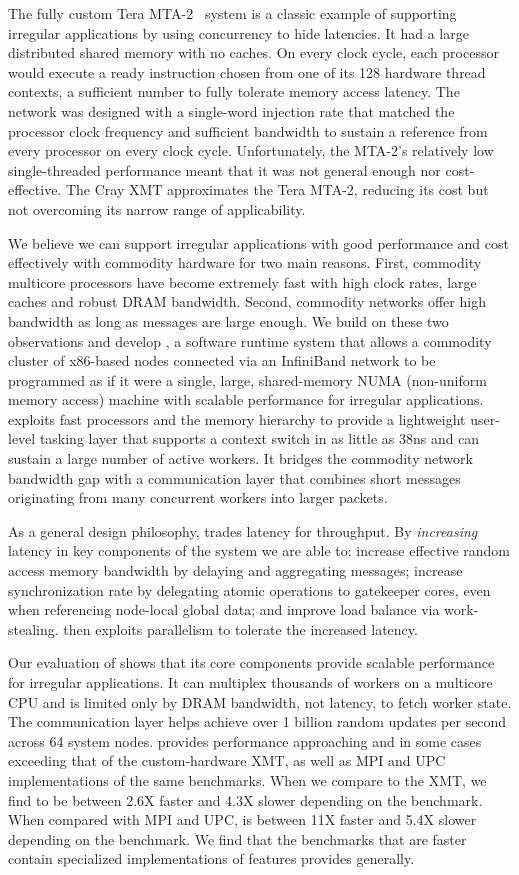 The fully custom Tera MTA-2~\cite{tera:mta1,Alverson:1992:EHP:143369.143408} system is a classic example of
supporting irregular applications by using concurrency to hide latencies. It
had a large distributed shared memory with no caches. On every clock cycle,
each processor would execute a ready instruction chosen from one of its 128
hardware thread contexts, a sufficient number to fully tolerate memory access
latency. The network was designed with a single-word injection rate that
matched the processor clock frequency and sufficient bandwidth to sustain a
reference from every processor on every clock cycle. Unfortunately, the MTA-2's relatively low single-threaded performance meant that it
was not general enough nor cost-effective. The Cray XMT approximates the Tera
MTA-2, reducing its cost but not overcoming its narrow range of applicability.

We believe we can support irregular applications with good performance and cost effectively with commodity hardware for two main reasons. First, commodity multicore processors have become extremely fast with high clock rates, large caches and robust DRAM bandwidth. Second, commodity networks offer high bandwidth as long as messages are large enough. We build on these two observations and develop \Grappa, a software runtime system that allows a commodity cluster of x86-based nodes connected via an InfiniBand network to be programmed as if it were a single, large, shared-memory NUMA (non-uniform memory access) machine with scalable performance for irregular applications. \Grappa exploits fast processors and the memory hierarchy to provide a lightweight user-level tasking layer that supports a context switch in as little as 38ns and can sustain a large number of active workers. It bridges the commodity network bandwidth gap with a communication layer that combines short messages originating from many concurrent workers into larger packets.

As a general design philosophy, \Grappa trades latency for throughput.  By \emph{increasing\/} latency in key components of the system we are able to: increase effective random access memory bandwidth by delaying and aggregating messages; increase synchronization rate by delegating atomic operations to gatekeeper cores, even when referencing node-local global data; and improve load balance via work-stealing.  \Grappa then exploits parallelism to tolerate the increased latency.

Our evaluation of \Grappa shows that its core components provide scalable performance for irregular applications. It can multiplex thousands of workers on a multicore CPU and is limited only by DRAM bandwidth, not latency, to fetch worker state.  The communication layer helps \Grappa achieve over 1 billion random updates per second across 64 system nodes. \Grappa provides performance approaching and in some cases exceeding that of the custom-hardware XMT, as well as MPI and UPC implementations of the same benchmarks. When we compare \Grappa to the XMT, we find \Grappa to be between 2.6X faster and 4.3X slower depending on the benchmark. When compared with MPI and UPC, \Grappa is between 11X faster and 5.4X slower depending on the benchmark. We find that the benchmarks that are faster contain specialized implementations of features \Grappa provides generally.
